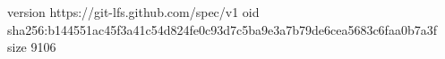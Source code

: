version https://git-lfs.github.com/spec/v1
oid sha256:b144551ac45f3a41c54d824fe0c93d7c5ba9e3a7b79de6cea5683c6faa0b7a3f
size 9106
